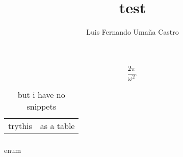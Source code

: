 \documentclass[]{article}
\author{Luis Fernando Umaña Castro}
\title{test}
\date{}
\begin{document}
  \maketitle
  \[
    \frac{2\pi }{\omega ^2}
  .\]

  \begin{table}[htb!]
    \caption{but i have no snippets}
    \centering
    \begin{tabular}{cc}
      trythis & as a table \\
    \end{tabular}
  \end{table}
\begin{gather*}
  
\end{gather*}
enum
\end{document}
